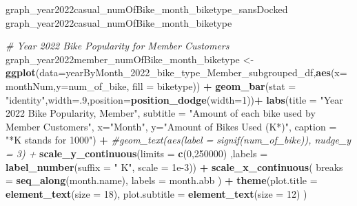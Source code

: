 \documentclass[
]{article}
\newenvironment{Shaded}{\begin{snugshade}}{\end{snugshade}}
\newcommand{\AttributeTok}[1]{\textcolor[rgb]{0.13,0.29,0.53}{#1}}
\newcommand{\CommentTok}[1]{\textcolor[rgb]{0.56,0.35,0.01}{\textit{#1}}}
\newcommand{\DecValTok}[1]{\textcolor[rgb]{0.00,0.00,0.81}{#1}}
\newcommand{\FloatTok}[1]{\textcolor[rgb]{0.00,0.00,0.81}{#1}}
\newcommand{\FunctionTok}[1]{\textcolor[rgb]{0.13,0.29,0.53}{\textbf{#1}}}
\newcommand{\NormalTok}[1]{#1}
\newcommand{\OtherTok}[1]{\textcolor[rgb]{0.56,0.35,0.01}{#1}}
\newcommand{\SpecialCharTok}[1]{\textcolor[rgb]{0.81,0.36,0.00}{\textbf{#1}}}
\newcommand{\StringTok}[1]{\textcolor[rgb]{0.31,0.60,0.02}{#1}}
\begin{document}
\begin{Shaded}
\begin{Highlighting}[]
\NormalTok{graph\_year2022casual\_numOfBike\_month\_biketype\_sansDocked}
\NormalTok{graph\_year2022casual\_numOfBike\_month\_biketype}
\end{Highlighting}
\end{Shaded}

\begin{Shaded}
\begin{Highlighting}[]
\CommentTok{\# Year 2022 Bike Popularity for Member Customers}
\NormalTok{graph\_year2022member\_numOfBike\_month\_biketype }\OtherTok{\textless{}{-}} \FunctionTok{ggplot}\NormalTok{(}\AttributeTok{data=}\NormalTok{yearByMonth\_2022\_bike\_type\_Member\_subgrouped\_df,}\FunctionTok{aes}\NormalTok{(}\AttributeTok{x=}\NormalTok{monthNum,}\AttributeTok{y=}\NormalTok{num\_of\_bike, }\AttributeTok{fill =}\NormalTok{ biketype)) }\SpecialCharTok{+}
  \FunctionTok{geom\_bar}\NormalTok{(}\AttributeTok{stat =} \StringTok{"identity"}\NormalTok{,}\AttributeTok{width=}\NormalTok{.}\DecValTok{9}\NormalTok{,}\AttributeTok{position=}\FunctionTok{position\_dodge}\NormalTok{(}\AttributeTok{width=}\DecValTok{1}\NormalTok{))}\SpecialCharTok{+}
  \FunctionTok{labs}\NormalTok{(}\AttributeTok{title =} \StringTok{"Year 2022 Bike Popularity, Member"}\NormalTok{,}
       \AttributeTok{subtitle =} \StringTok{"Amount of each bike used by Member Customers"}\NormalTok{,}
       \AttributeTok{x=}\StringTok{"Month"}\NormalTok{,}
       \AttributeTok{y=}\StringTok{"Amount of Bikes Used (K*)"}\NormalTok{,}
       \AttributeTok{caption =} \StringTok{"*K stands for 1000"}\NormalTok{) }\SpecialCharTok{+}
  \CommentTok{\#geom\_text(aes(label = signif(num\_of\_bike)), nudge\_y = 3) +}
  \FunctionTok{scale\_y\_continuous}\NormalTok{(}\AttributeTok{limits =} \FunctionTok{c}\NormalTok{(}\DecValTok{0}\NormalTok{,}\DecValTok{250000}\NormalTok{) ,}\AttributeTok{labels =} \FunctionTok{label\_number}\NormalTok{(}\AttributeTok{suffix =} \StringTok{" K"}\NormalTok{, }\AttributeTok{scale =} \FloatTok{1e{-}3}\NormalTok{)) }\SpecialCharTok{+}
  \FunctionTok{scale\_x\_continuous}\NormalTok{(}
    \AttributeTok{breaks =} \FunctionTok{seq\_along}\NormalTok{(month.name), }
    \AttributeTok{labels =}\NormalTok{ month.abb}
\NormalTok{  )  }\SpecialCharTok{+}
  \FunctionTok{theme}\NormalTok{(}\AttributeTok{plot.title =} \FunctionTok{element\_text}\NormalTok{(}\AttributeTok{size =} \DecValTok{18}\NormalTok{),}
        \AttributeTok{plot.subtitle =} \FunctionTok{element\_text}\NormalTok{(}\AttributeTok{size =} \DecValTok{12}\NormalTok{)}
\NormalTok{  )}


\end{Highlighting}
\end{Shaded}
\end{document}
